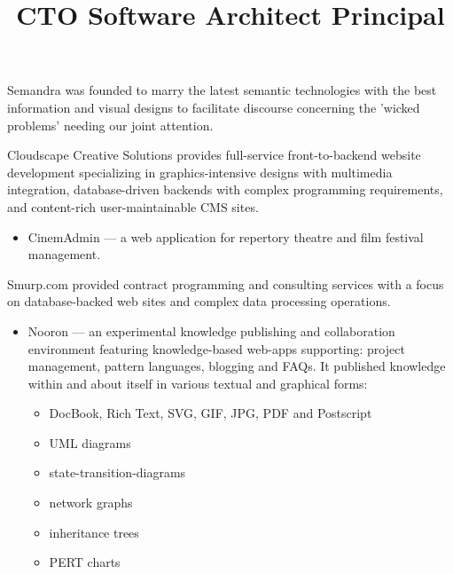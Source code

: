 \begin{resume}


\title{ CTO }
\begin{position}
Semandra was founded to marry the latest semantic technologies 
with the best information and visual designs to facilitate 
discourse concerning the 'wicked problems' needing our joint attention.
\end{position}


\title{ Software Architect }
\begin{position}
Cloudscape Creative Solutions provides full-service front-to-backend
website development specializing in graphics-intensive designs with
multimedia integration, database-driven backends with complex
programming requirements, and content-rich user-maintainable CMS
sites.

\begin{itemize}
  \item CinemAdmin --- a web application for repertory theatre and film festival management.
\end{itemize}

\end{position}


\title{ Principal }

\begin{position}
Smurp.com provided contract programming and consulting services with a focus
on database-backed web sites and complex data processing operations.

\begin{itemize}
  \item Nooron --- an experimental knowledge publishing and collaboration
    environment featuring knowledge-based web-apps supporting: 
      project management, pattern languages, blogging and FAQs.
     It published knowledge within and about itself in various textual and graphical forms:
       \begin{itemize}
          \item DocBook, Rich Text, SVG, GIF, JPG, PDF and Postscript
	  \item UML diagrams
          \item state-transition-diagrams
          \item network graphs
          \item inheritance trees
          \item PERT charts
       \end{itemize}


\end{itemize}
\end{position}
\end{resume}
